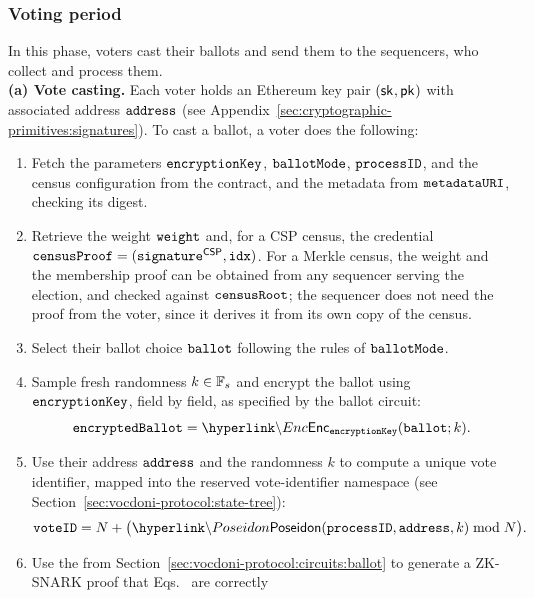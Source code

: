 \subsubsection{Voting period}
\label{sec:vocdoni-protocol:votes}

In this phase, voters cast their ballots and send them to the sequencers, who collect and process them. \\

\noi \textbf{(a) Vote casting.} Each voter holds an Ethereum key pair $({\sf{sk}^{}}, {\sf{pk}^{}})$ with
associated address $\texttt{address}$ (see Appendix~\ref{sec:cryptographic-primitives:signatures}).
To cast a ballot, a voter does the following:

\begin{enumerate}
	\item Fetch the parameters $\texttt{encryptionKey}$, $\texttt{ballotMode}$, $\texttt{processID}$, and the census configuration from the
	\hlget{\processregistry} contract, and the metadata from $\texttt{metadataURI}$, checking its digest.
	\item Retrieve the weight $\texttt{weight}$ and, for a \ac{CSP} census, the credential $\texttt{censusProof} = (\texttt{signature}^{\mathsf{CSP}}, \texttt{idx})$. For a Merkle census, the weight and the membership proof can be obtained from any sequencer serving the election, and checked against $\texttt{censusRoot}$; the sequencer does not need the proof from the voter, since it derives it from its own copy of the census.
	\item Select their ballot choice $\texttt{ballot}$ following the rules of $\texttt{ballotMode}$.
	\item Sample fresh randomness $k \in \mathbb{F}_s$ and encrypt the ballot using $\texttt{encryptionKey}$, field by field, as specified by the ballot circuit:
	\begin{equation}\label{eq-ciphertext}
		\encryptedballot = \hlget{\Enc}_{\epk}(\ballot; k).
	\end{equation}
	\item Use their address $\texttt{address}$ and the randomness $k$ to compute a unique vote
	identifier, mapped into the reserved vote-identifier namespace
	(see Section~\ref{sec:vocdoni-protocol:state-tree}):
	\begin{equation}\label{eq-voteid}
		\voteid = N + \bigl(\hlget{\Poseidon}(\processid, \address, k) \bmod N\bigr).
	\end{equation}
	\item Use the \ballotcircuit from Section~\ref{sec:vocdoni-protocol:circuits:ballot} to
	generate a \ac{ZK-SNARK} proof that Eqs.~ are correctly

\end{enumerate}

